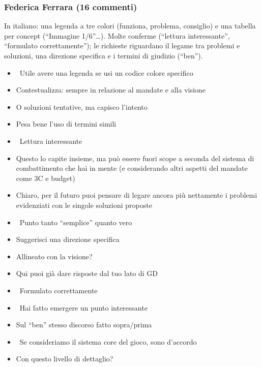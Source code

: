 \subsubsection{Federica Ferrara (16 commenti)}
In italiano: una legenda a tre colori (funziona, problema, consiglio) e una tabella per concept (``Immagine 1/6''\dots). Molte conferme (``lettura interessante'', ``formulato correttamente''); le richieste riguardano il legame tra problemi e soluzioni, una direzione specifica e i termini di giudizio (``ben'').
{\small
\begin{itemize}
  \item {} \rvBene\ Utile avere una legenda se usi un codice colore specifico
  \item {} Contestualizza: sempre in relazione al mandate e alla visione
  \item {} O soluzioni tentative, ma capisco l'intento
  \item {} Pesa bene l'uso di termini simili
  \item {} \rvBene\ Lettura interessante
  \item {} Questo lo capite insieme, ma può essere fuori scope a seconda del sistema di combattimento che hai in mente (e considerando altri aspetti del mandate come 3C e budget)
  \item {} Chiaro, per il futuro puoi pensare di legare ancora più nettamente i problemi evidenziati con le singole soluzioni proposte
  \item {} \rvBene\ Punto tanto ``semplice'' quanto vero
  \item {} Suggerisci una direzione specifica
  \item {} Allineato con la visione?
  \item {} Qui puoi già dare risposte dal tuo lato di GD
  \item {} \rvBene\ Formulato correttamente
  \item {} \rvBene\ Hai fatto emergere un punto interessante
  \item {} Sul ``ben'' stesso discorso fatto sopra/prima
  \item {} \rvBene\ Se consideriamo il sistema core del gioco, sono d'accordo
  \item {} Con questo livello di dettaglio?
\end{itemize}
}
